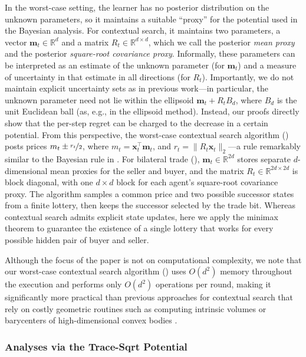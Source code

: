\documentclass[11pt]{article}
\newcommand{\Rbb}{\mathbb R}
\newcommand{\norm}[1]{\lVert #1\rVert_2}
\newcommand{\bm}{\boldsymbol m}
\newcommand{\bx}{\boldsymbol x}
\begin{document}
In the worst-case setting,
the learner has no
posterior distribution on the unknown parameters, {so it maintains a suitable ``proxy'' {for the potential} used in the Bayesian analysis}. For contextual search, it
maintains two parameters, a vector $\bm_t\in \Rbb^d$ and a matrix
$R_t\in \Rbb^{d\times d}$, which we call the posterior \textit{mean
  proxy} and the posterior \textit{square-root covariance
  proxy}. Informally, these parameters can be interpreted as an
estimate of the unknown parameter (for $\bm_t$) and a measure of
uncertainty in that estimate in all directions (for
$R_t$). Importantly, we do not maintain explicit uncertainty sets as
in previous work---in particular, the unknown parameter need not lie
within the ellipsoid $\bm_t + R_tB_d$, where $B_d$ is the unit
Euclidean ball (as, e.g., in the {ellipsoid} method). Instead, our
proofs directly show that the per-step regret can be charged to the
{decrease in} a certain potential. {From this perspective, the worst-case
contextual search algorithm ()} posts prices
$m_t \pm \nicefrac{r_t}{2}$, where $m_t = \bx_t^\top\bm_t$, and
$r_t = \norm{R_t \bx_t}$---{a rule remarkably similar to the Bayesian rule in}
.
{For bilateral trade (), $\bm_t\in\Rbb^{2d}$ stores separate $d$-dimensional mean proxies for the seller and buyer, and the matrix $R_t\in\Rbb^{2d\times2d}$ is block diagonal, with one $d\times d$ block for each agent's square-root covariance proxy. The algorithm samples a common price and two possible successor states from a finite lottery, then keeps the successor selected by the trade bit. {Whereas contextual search admits explicit state updates, here we apply} the minimax theorem to guarantee the existence of a single lottery that works for every {possible} hidden pair of buyer and seller.}


Although the focus of the paper is not on computational complexity, we
note that {our worst-case contextual search algorithm ()} uses
$O(d^2)$ memory throughout the execution and performs only $O(d^2)$
operations per round, making it significantly {more practical than}
previous approaches for contextual search that rely on costly
geometric routines such as computing intrinsic volumes or barycenters
of high-dimensional convex bodies \cite{PLS18,LPS21}.


\subsubsection{Analyses via the Trace-Sqrt Potential}\label{sec:potential}
\end{document}
